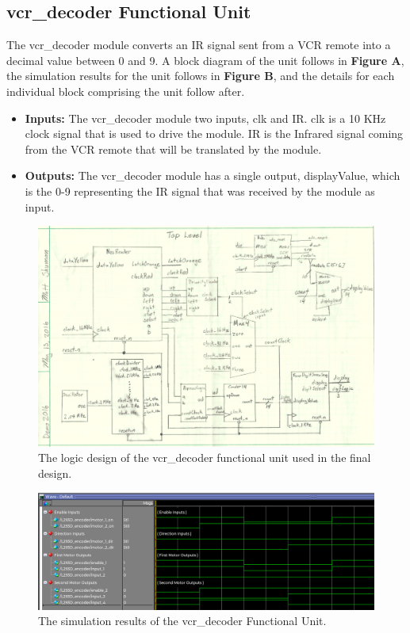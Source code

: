 \documentclass[a4paper]{article}
\begin{document}
\clearpage



\subsection{vcr\_decoder Functional Unit}
The vcr\_decoder module converts an IR signal sent from a VCR remote into a decimal value between 0 and 9. A block diagram of the unit follows in \textbf{Figure A}, the simulation results for the unit follows in \textbf{Figure B}, and the details for each individual block comprising the unit follow after.
\begin{itemize}
  \item \textbf{Inputs:  } The vcr\_decoder module two inputs, clk and IR. clk is a 10 KHz clock signal that is used to drive the module. IR is the Infrared signal coming from the VCR remote that will be translated by the module.
  \item \textbf{Outputs: } The vcr\_decoder module has a single output, displayValue, which is the 0-9 representing the IR signal that was received by the module as input.
\end{itemize}
\begin{figure}[h]
  \centering
    \includegraphics[width=.8\textwidth]{images/functional_1.png}
	\caption{The logic design of the vcr\_decoder functional unit used in the final design.}
    \label{fig:functional-1}
\end{figure}
\begin{figure}[h]
  \centering
    \includegraphics[width=.98\textwidth]{sims/functional_1.png}
	\caption{The simulation results of the vcr\_decoder Functional Unit.}
    \label{fig:top-level-sim}
\end{figure}
\end{document}
